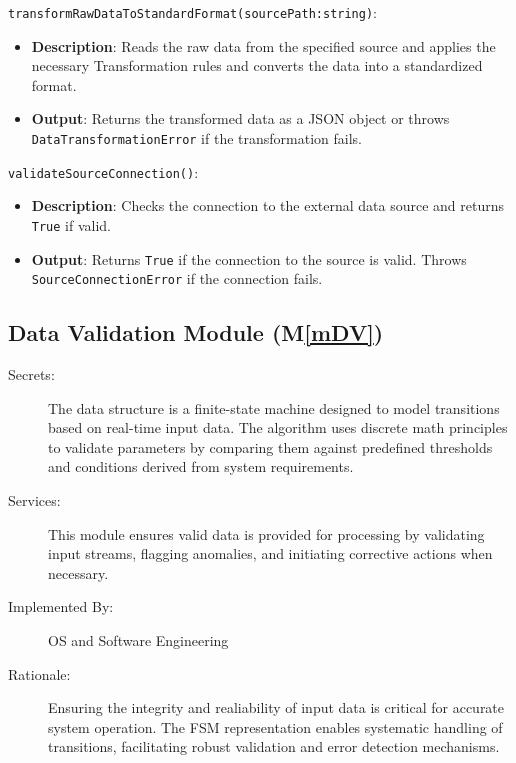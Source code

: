 \documentclass[12pt, titlepage]{article}
\newcommand{\mref}[1]{M\ref{#1}}
\begin{document}
\begin{description}
  \item[Local Function:] 
  \item
  \texttt{transformRawDataToStandardFormat(sourcePath:string)}:
  \item
  \begin{itemize}
    \item \textbf{Description}: Reads the raw data from the specified source and applies the necessary Transformation
    rules and converts the data into a standardized format.
  \end{itemize}
  \item 
  \begin{itemize}
    \item \textbf{Output}: Returns the transformed data as a JSON object or throws \\
    \texttt{DataTransformationError} if the transformation fails.
  \end{itemize}
  \item 

  \texttt{validateSourceConnection()}:
  \item 
  \begin{itemize}
    \item \textbf{Description}: Checks the connection to the external data source and returns \texttt{True} if valid.
  \end{itemize}
  \item 
  \begin{itemize}
    \item \textbf{Output}: Returns \texttt{True} if the connection to the source is valid. Throws \\
   \texttt{SourceConnectionError} if the connection fails.
  \end{itemize}
\end{description}

\subsection{Data Validation Module (\mref{mDV})}
\begin{description}
  \item[Secrets:] The data structure is a finite-state machine designed to model transitions based on real-time 
  input data. The algorithm uses discrete math principles to validate parameters by comparing them against predefined
  thresholds and conditions derived from system requirements.
  \item[Services:] This module ensures valid data is provided for processing by validating input streams, flagging
  anomalies, and initiating corrective actions when necessary.
  \item[Implemented By:] OS and Software Engineering
  \item[Rationale:] Ensuring the integrity and realiability of input data is critical for accurate system operation.
  The FSM representation enables systematic handling of transitions, facilitating robust validation and error 
  detection mechanisms.
\end{description}
\end{document}

